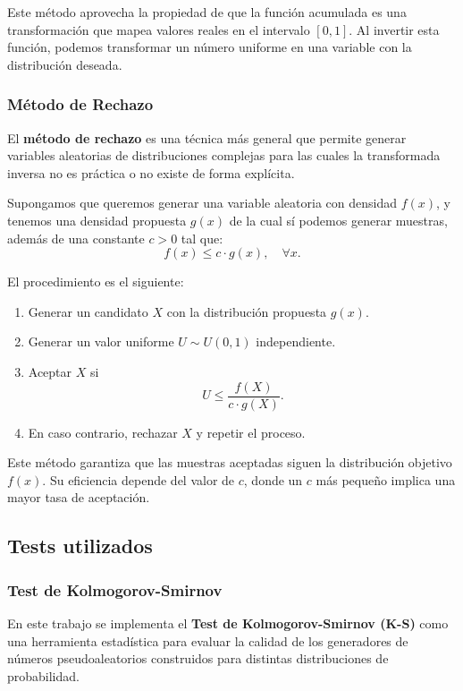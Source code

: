 \documentclass{article}
\begin{document}
Este método aprovecha la propiedad de que la función acumulada es una transformación que mapea valores reales en el intervalo $[0,1]$. Al invertir esta función, podemos transformar un número uniforme en una variable con la distribución deseada.

\subsubsection{Método de Rechazo}

El \textbf{método de rechazo} es una técnica más general que permite generar variables aleatorias de distribuciones complejas para las cuales la transformada inversa no es práctica o no existe de forma explícita.

Supongamos que queremos generar una variable aleatoria con densidad $f(x)$, y tenemos una densidad propuesta $g(x)$ de la cual sí podemos generar muestras, además de una constante $c > 0$ tal que:
\begin{equation}
    f(x) \leq c \cdot g(x), \quad \forall x.
\end{equation}

El procedimiento es el siguiente:

\begin{enumerate}
    \item Generar un candidato $X$ con la distribución propuesta $g(x)$.
    \item Generar un valor uniforme $U \sim U(0,1)$ independiente.
    \item Aceptar $X$ si 
    \[
        U \leq \frac{f(X)}{c \cdot g(X)}.
    \]
    \item En caso contrario, rechazar $X$ y repetir el proceso.
\end{enumerate}

Este método garantiza que las muestras aceptadas siguen la distribución objetivo $f(x)$. Su eficiencia depende del valor de $c$, donde un $c$ más pequeño implica una mayor tasa de aceptación.

\subsection{Tests utilizados}
\subsubsection{Test de Kolmogorov-Smirnov}
En este trabajo se implementa el \textbf{Test de Kolmogorov-Smirnov (K-S)} como una herramienta estadística para evaluar la calidad de los generadores de números pseudoaleatorios construidos para distintas distribuciones de probabilidad.
\end{document}
